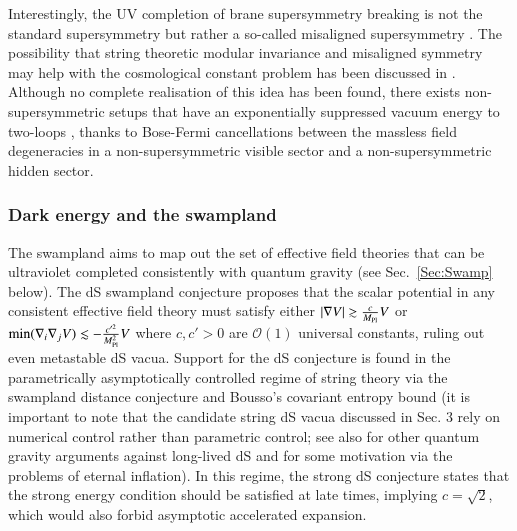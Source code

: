 Interestingly, the UV completion \cite{Cribiori:2020sct} of brane supersymmetry breaking is not the standard supersymmetry but rather a so-called misaligned supersymmetry \cite{Dienes:1994np, Cribiori:2021txm}. The possibility that string theoretic modular invariance and misaligned symmetry may help with the cosmological constant problem has been discussed in \cite{Dienes:2001se}.  Although no complete realisation of this idea has been found, there exists non-supersymmetric setups that have an exponentially suppressed vacuum energy to two-loops \cite{Kachru:1998hd, Kachru:1998pg, Abel:2015oxa, Abel:2017rch}, thanks to Bose-Fermi cancellations between the massless field degeneracies in a non-supersymmetric visible sector and a non-supersymmetric hidden sector.


\subsubsection{Dark energy and the swampland}
\label{S:DEswamp}

The swampland aims to map out the set of effective field theories that can be ultraviolet completed consistently with quantum gravity (see Sec.~\ref{Sec:Swamp} below). The dS swampland conjecture \cite{Obied:2018sgi, Garg:2018reu, Ooguri:2018wrx} proposes that the scalar potential in any consistent effective field theory must satisfy either $|\nabla V| \gtrsim \frac{c}{M_{\rm Pl}}V$ or $\textrm{min}(\nabla_i \nabla_j V)\lesssim -\frac{c'^2}{M_{\rm Pl}^2} V$ where $c,c'>0$ are $\mathcal{O}(1)$ universal constants, ruling out even metastable dS vacua. Support for the dS conjecture is found in the parametrically asymptotically controlled regime of string theory via the swampland distance conjecture and Bousso's covariant entropy bound \cite{Ooguri:2018wrx} (it is important to note that the candidate string dS vacua discussed in Sec. 3 rely on numerical control rather than parametric control; see also \cite{Dvali:2018jhn, Dvali:2018fqu} for other quantum gravity arguments against long-lived dS and \cite{Rudelius:2019cfh} for some motivation via the problems of eternal inflation). In this regime, the strong dS conjecture \cite{Rudelius:2021azq} states that the strong energy condition should be satisfied at late times, implying $c=\sqrt{2}$, which would also forbid asymptotic accelerated expansion. 

